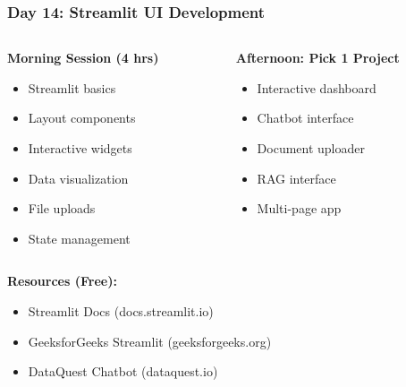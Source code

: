 \begin{frame}[fragile]\frametitle{Day 14: Streamlit UI Development}
\begin{columns}
    \begin{column}[T]{0.5\linewidth}
      \textbf{Morning Session (4 hrs)}
      \begin{itemize}
        \item Streamlit basics
        \item Layout components
        \item Interactive widgets
        \item Data visualization
        \item File uploads
        \item State management
      \end{itemize}
    \end{column}
    \begin{column}[T]{0.5\linewidth}
      \textbf{Afternoon: Pick 1 Project}
      \begin{itemize}
        \item Interactive dashboard
        \item Chatbot interface
        \item Document uploader
        \item RAG interface
        \item Multi-page app
      \end{itemize}
    \end{column}
  \end{columns}
  
  \vspace{0.3cm}
  \textbf{Resources (Free):}
  \begin{itemize}
    \item Streamlit Docs (docs.streamlit.io)
    \item GeeksforGeeks Streamlit (geeksforgeeks.org)
    \item DataQuest Chatbot (dataquest.io)
  \end{itemize}
\end{frame}

